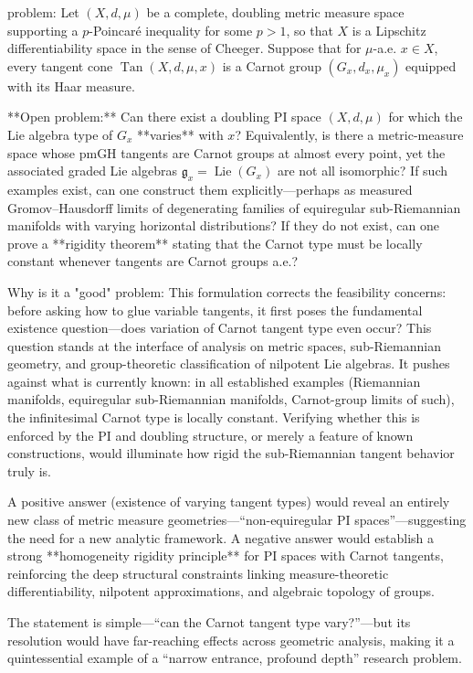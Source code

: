 problem:  
Let \((X,d,\mu)\) be a complete, doubling metric measure space supporting a \(p\)-Poincaré inequality for some \(p>1\), so that \(X\) is a Lipschitz differentiability space in the sense of Cheeger.  
Suppose that for \(\mu\)-a.e. \(x\in X\), every tangent cone \(\operatorname{Tan}(X,d,\mu,x)\) is a Carnot group \((G_x,d_x,\mu_x)\) equipped with its Haar measure.  

**Open problem:**  
Can there exist a doubling PI space \((X,d,\mu)\) for which the Lie algebra type of \(G_x\) **varies** with \(x\)?  
Equivalently, is there a metric-measure space whose pmGH tangents are Carnot groups at almost every point, yet the associated graded Lie algebras \(\mathfrak g_x = \operatorname{Lie}(G_x)\) are not all isomorphic?  
If such examples exist, can one construct them explicitly—perhaps as measured Gromov–Hausdorff limits of degenerating families of equiregular sub-Riemannian manifolds with varying horizontal distributions?  
If they do not exist, can one prove a **rigidity theorem** stating that the Carnot type must be locally constant whenever tangents are Carnot groups a.e.?

Why is it a "good" problem:  
This formulation corrects the feasibility concerns: before asking how to glue variable tangents, it first poses the fundamental existence question—does variation of Carnot tangent type even occur?  
This question stands at the interface of analysis on metric spaces, sub-Riemannian geometry, and group-theoretic classification of nilpotent Lie algebras. It pushes against what is currently known: in all established examples (Riemannian manifolds, equiregular sub-Riemannian manifolds, Carnot-group limits of such), the infinitesimal Carnot type is locally constant. Verifying whether this is enforced by the PI and doubling structure, or merely a feature of known constructions, would illuminate how rigid the sub-Riemannian tangent behavior truly is.  

A positive answer (existence of varying tangent types) would reveal an entirely new class of metric measure geometries—“non-equiregular PI spaces”—suggesting the need for a new analytic framework.  
A negative answer would establish a strong **homogeneity rigidity principle** for PI spaces with Carnot tangents, reinforcing the deep structural constraints linking measure-theoretic differentiability, nilpotent approximations, and algebraic topology of groups.  

The statement is simple—“can the Carnot tangent type vary?”—but its resolution would have far-reaching effects across geometric analysis, making it a quintessential example of a “narrow entrance, profound depth” research problem.